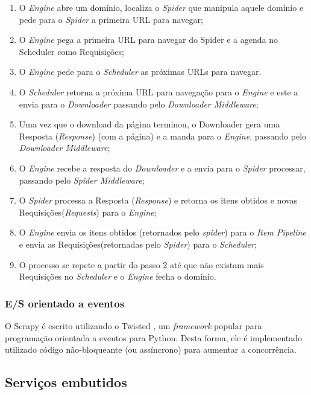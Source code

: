\begin{enumerate}
	\item O \emph{Engine} abre um domínio, localiza o \emph{Spider} que manipula aquele domínio e pede para o \emph{Spider} a primeira URL para navegar;
	\item O \emph{Engine} pega a primeira URL para navegar do Spider e a agenda no Scheduler como Requisições;
	\item O \emph{Engine} pede para o \emph{Scheduler} as próximas URLs para navegar.
	\item O \emph{Scheduler} retorna a próxima URL para navegação para o \emph{Engine} e este a envia para o \emph{Downloader} passando pelo \emph{Downloader Middleware};
	\item Uma vez que o download da página terminou, o Downloader gera uma Resposta (\emph{Response}) (com a página) e a manda para o \emph{Engine}, passando pelo \emph{Downloader Middleware};
	\item O \textit{Engine} recebe a resposta do \textit{Downloader} e a envia para o \textit{Spider} processar, passando pelo \textit{Spider Middleware};
	\item O \textit{Spider} processa a Resposta (\textit{Response}) e retorna os itens obtidos e novas Requisições(\textit{Requests}) para o \textit{Engine};
	\item O \textit{Engine} envia os itens obtidos (retornados pelo \textit{spider}) para o \textit{Item Pipeline} e envia as Requisições(retornadas pelo \textit{Spider}) para o \textit{Scheduler};
	\item O processo se repete a partir do passo 2 até que não existam mais Requisições no \textit{Scheduler} e o \textit{Engine} fecha o domínio.
\end{enumerate}

\subsubsection{E/S orientado a eventos}

O Scrapy é escrito utilizando o Twisted \cite{twisted}, um \textit{framework} popular para programação orientada a eventos para Python. Desta forma, ele é implementado utilizado código não-bloqueante (ou assíncrono) para aumentar a concorrência.

\subsection{Serviços embutidos}

